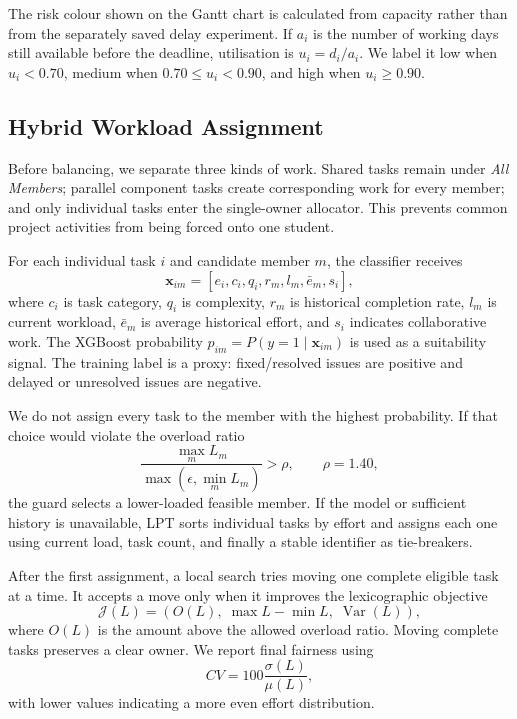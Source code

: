\documentclass[conference]{IEEEtran}
\begin{document}
The risk colour shown on the Gantt chart is calculated from capacity rather than from the separately saved delay experiment. If $a_i$ is the number of working days still available before the deadline, utilisation is $u_i=d_i/a_i$. We label it low when $u_i<0.70$, medium when $0.70\leq u_i<0.90$, and high when $u_i\geq0.90$.

\subsection{Hybrid Workload Assignment}
Before balancing, we separate three kinds of work. Shared tasks remain under \emph{All Members}; parallel component tasks create corresponding work for every member; and only individual tasks enter the single-owner allocator. This prevents common project activities from being forced onto one student.

For each individual task $i$ and candidate member $m$, the classifier receives
\begin{equation}
\mathbf{x}_{im}=[e_i,c_i,q_i,r_m,l_m,\bar{e}_m,s_i],
\end{equation}
where $c_i$ is task category, $q_i$ is complexity, $r_m$ is historical completion rate, $l_m$ is current workload, $\bar{e}_m$ is average historical effort, and $s_i$ indicates collaborative work. The XGBoost probability $p_{im}=P(y=1\mid\mathbf{x}_{im})$ is used as a suitability signal. The training label is a proxy: fixed/resolved issues are positive and delayed or unresolved issues are negative.

We do not assign every task to the member with the highest probability. If that choice would violate the overload ratio
\begin{equation}
\frac{\max_m L_m}{\max(\epsilon,\min_m L_m)}>\rho,\qquad \rho=1.40,
\label{eq:guard}
\end{equation}
the guard selects a lower-loaded feasible member. If the model or sufficient history is unavailable, LPT sorts individual tasks by effort and assigns each one using current load, task count, and finally a stable identifier as tie-breakers.

After the first assignment, a local search tries moving one complete eligible task at a time. It accepts a move only when it improves the lexicographic objective
\begin{equation}
\mathcal{J}(L)=\left(O(L),\;\max L-\min L,\;\operatorname{Var}(L)\right),
\end{equation}
where $O(L)$ is the amount above the allowed overload ratio. Moving complete tasks preserves a clear owner. We report final fairness using
\begin{equation}
CV=100\frac{\sigma(L)}{\mu(L)},
\end{equation}
with lower values indicating a more even effort distribution.
\end{document}
